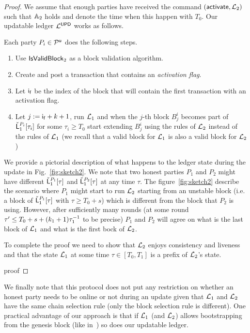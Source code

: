 \begin{proof}
We assume that enough parties have received the command $(\mathsf{activate}, \mathcal{L}_2)$ such that
$\mathbb{A}_2$ holds and denote the time when this happen with $T_0$.
Our updatable ledger $\mathcal{L}^\mathsf{UPD}$ works as follows.

Each party $P_i\in\mathcal{P}^\mathsf{u}$ does the following steps.
\begin{enumerate}
	\item Use $\mathsf{IsValidBlock}_2$ as a block validation algorithm.
	\item Create and post a transaction that contains an \emph{activation flag}. 
	\item Let $\mathsf{i_f}$ be the index of the block that will contain the first transaction with an activation flag.
	\item Let $j:=\mathsf{i_f}+k+1$, run $\mathcal{L}_1$ and when the $j$-th block $B^i_j$ becomes part of $\check {\mathsf{L}}_1^{P_i}[\tau_i]$ for some $\tau_i \geq T_0$ start extending $B^i_{j}$ using the rules of $\mathcal{L}_2$ instead of the rules of $\mathcal{L}_1$ (we recall that a valid block for $\mathcal{L}_1$ is also a valid block for $\mathcal{L}_2$)
\end{enumerate}


We provide a pictorial description of what happens to the ledger state during the update in Fig.~\ref{fig:sketch2}.
We note that two honest parties $P_1$ and $P_2$ might have different $\check {\mathsf{L}}_1^{P_1}[\tau]$ and  $\check {\mathsf{L}}_1^{P_2}[\tau]$ at any time $\tau$. The figure~\ref{fig:sketch2}
describe the scenario where $P_1$ might start to run $\mathcal{L}_2$ starting from an 
unstable block (i.e. a block of  $\check {\mathsf{L}}_1^{P_1}[\tau]$ with $\tau\geq
T_0+s$) which is different from the block that $P_2$ is using. However, after sufficiently many
 rounds (at some round  $\tau'\leq T_0+s+(k_1+1)\tau_1^{-1}$ to be precise) $P_1$ and $P_2$ will agree on what is the last block of $\mathcal{L}_1$ and what is the first bock of $\mathcal{L}_2$.

 

To complete the proof we need to show that $\mathcal{L}_2$ enjoys consistency and liveness
and that the state $\mathcal{L}_1$ at some time $\tau\in [T_0,T_1]$ is a prefix of $\mathcal{L}_2$'s state. 


{proof}

\end{proof}



We finally note that this protocol does not put any restriction on whether an honest party needs to be online or not during an update given that $\mathcal{L}_1$ and $\mathcal{L}_2$ have the same chain selection rule (only the block selection rule is different).
One practical advantage of our approach is that if $\mathcal{L}_1$ (and $\mathcal{L}_2$) allows bootstrapping from the genesis block (like in~\cite{CCS:BGKRZ18}) so does our updatable ledger.




